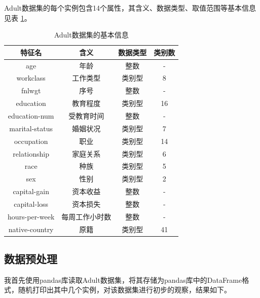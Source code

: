 \documentclass[12pt,a4paper]{article}
\theoremstyle{definition}
\begin{document}
\vspace{-0.01\linewidth}
Adult数据集的每个实例包含14个属性，其含义、数据类型、取值范围等基本信息见表 \ref{tab:feature-info}。

\begin{table}[H]
	\renewcommand\arraystretch{1.15}
	\caption{Adult数据集的基本信息}
	\label{tab:feature-info}
	\centering
	
	\begin{tabular}{c|c|c|c}
		\centering
		 特征名 & 含义 & 数据类型 & 类别数 \\
		\hline
		\hline
		age & 年龄 & 整数 & - \\
		workclass & 工作类型 & 类别型 & 8 \\
		fnlwgt & 序号 & 整数 & - \\
		education & 教育程度 & 类别型 & 16 \\
		education-num & 受教育时间 & 整数 & - \\
		marital-status & 婚姻状况 & 类别型 & 7 \\
		occupation & 职业 & 类别型 & 14 \\
		relationship & 家庭关系 & 类别型 & 6 \\
		race & 种族 & 类别型 & 5 \\
		sex & 性别 & 类别型 & 2 \\
		capital-gain & 资本收益 & 整数 & - \\
		capital-loss & 	资本损失 & 整数 & - \\
		hours-per-week & 每周工作小时数 & 整数 & - \\
		native-country & 原籍 & 类别型 & 41 \\
		
	\end{tabular}
\end{table}

\subsection{数据预处理}

\vspace{0.01\linewidth}
我首先使用pandas库读取Adult数据集，将其存储为pandas库中的DataFrame格式，随机打印出其中几个实例，对该数据集进行初步的观察，结果如下。
\end{document}
